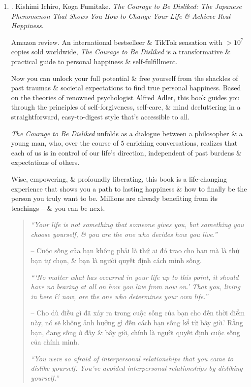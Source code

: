 \documentclass{article}
\begin{document}
\begin{enumerate}
	\item \cite{Ichiro_Fumitake_disliked}. {\sc Kishimi Ichiro, Koga Fumitake}. {\it The Courage to Be Disliked: The Japanese Phenomenon That Shows You How to Change Your Life \& Achieve Real Happiness}. {}
	
	{\sf Amazon review.} An international bestselleer \& TikTok sensation with $> 10^7$ copies sold worldwide, {\it The Courage to Be  Disliked} is a transformative \& practical guide to personal happiness \& self-fulfillment.
	
	Now you can unlock your full potential \& free yourself from the shackles of past traumas \& societal expectations to find true personal happiness. Based on the theories of renowned psychologist {\sc Alfred Adler}, this book guides you through the principles of self-forgiveness, self-care, \& mind decluttering in a straightforward, easy-to-digest style that's accessible to all.
	
	{\it The Courage to Be Disliked} unfolds as a dialogue between a philosopher \& a young man, who, over the course of 5 enriching conversations, realizes that each of us is in control of our life's direction, independent of past burdens \& expectations of others.
	
	Wise, empowering, \& profoundly liberating, this book is a life-changing experience that shows you a path to lasting happiness \& how to finally be the person you truly want to be. Millions are already benefiting from its teachings -- \& you can be next.
	\begin{quotation}
		{\it``Your life is not something that someone gives you, but something you choose yourself, \& you are the one who decides how you live.''}
		
		-- Cuộc sống của bạn không phải là thứ ai đó trao cho bạn mà là thứ bạn tự chọn, \& bạn là người quyết định cách mình sống.
		
		{\it```No matter what has occurred in your life up to this point, it should have no bearing at all on how you live from now on.' That you, living in here \& now, are the one who determines your own life.''}
		
		-- Cho dù điều gì đã xảy ra trong cuộc sống của bạn cho đến thời điểm này, nó sẽ không ảnh hưởng gì đến cách bạn sống kể từ bây giờ.' Rằng bạn, đang sống ở đây \& bây giờ, chính là người quyết định cuộc sống của chính mình.
		
		{\it``You were so afraid of interpersonal relationships that you came to dislike yourself. You've avoided interpersonal relationships by disliking yourself.''}
		

\end{quotation}
\end{enumerate}
\end{document}
